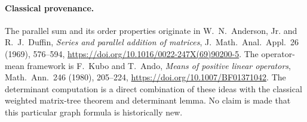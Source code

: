 \documentclass[11pt]{article}
\begin{document}
\paragraph{Classical provenance.}
The parallel sum and its order properties originate in
W.~N.~Anderson, Jr. and R.~J.~Duffin,
\emph{Series and parallel addition of matrices},
J.~Math.~Anal.~Appl.~26 (1969), 576--594,
\url{https://doi.org/10.1016/0022-247X(69)90200-5}.
The operator-mean framework is F.~Kubo and T.~Ando,
\emph{Means of positive linear operators},
Math.~Ann.~246 (1980), 205--224,
\url{https://doi.org/10.1007/BF01371042}.
The determinant computation is a direct combination of these ideas with
the classical weighted matrix-tree theorem and determinant lemma.
No claim is made that this particular graph formula is historically new.
\end{document}
